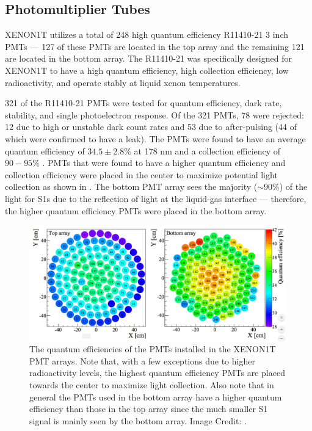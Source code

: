  
 \subsection{Photomultiplier Tubes}
 \label{sec:photomultiplier_tubes}
 
XENON1T utilizes a total of 248 high quantum efficiency  R11410-21 3 inch PMTs --- 127 of these PMTs are located in the top array and the remaining 121  are located in the bottom array.  The R11410-21 was specifically designed for XENON1T to have a high quantum efficiency, high collection efficiency, low radioactivity, and operate stably at liquid xenon temperatures.  

321 of the R11410-21 PMTs were tested for quantum efficiency, dark rate, stability, and single photoelectron response.  Of the 321 PMTs, 78 were rejected: 12 due to high or unstable dark count rates and 53 due to after-pulsing (44 of which were confirmed to have a leak).  The PMTs were found to have an average quantum efficiency of $34.5 \pm 2.8 \%$ at 178 nm and a collection efficiency of $90 - 95 \%$ \cite{barrow2017qualification}.  PMTs that were found to have a higher quantum efficiency and collection efficiency were placed in the center to maximize potential light collection as shown in .  The bottom PMT array sees the majority ($\sim 90\%$) of the light for S1s due to the reflection of light at the liquid-gas interface --- therefore, the higher quantum efficiency PMTs were placed in the bottom array.

\begin{figure}[t]
	\centering
	\includegraphics[width=0.99\textwidth]{xe1t_pmt_qe}
	\caption{The quantum efficiencies of the PMTs installed in the XENON1T PMT arrays.  Note that, with a few exceptions due to higher radioactivity levels, the highest quantum efficiency PMTs are placed towards the center to maximize light collection.  Also note that in general the PMTs used in the bottom array have a higher quantum efficiency than those in the top array since the much smaller S1 signal is mainly seen by the bottom array.  Image Credit: .}
	\label{fig:xe1t_pmt_qe}
\end{figure}
 
